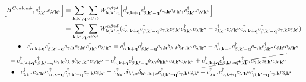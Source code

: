 \documentclass[12pt,english,a4paper]{article}
\newcommand{\dg}{\dagger}
\begin{document}
\begin{appendices}
\begin{align}
	\comm{H^{Coulomb}}{c^\dg_{\lambda \textbf{k}''} c_{\lambda' \textbf{k}''}} &= \sum_{\textbf{k}, \textbf{k}', \textbf{q}} \sum_{\alpha \beta \gamma \delta} W^{\alpha \beta \gamma \delta}_{\textbf{k},\textbf{k'},\textbf{q}}\comm{ c_{\alpha, \textbf{k}+\textbf{q}}^\dg c_{\beta, \textbf{k}' - \textbf{q}}^\dg c_{\gamma, \textbf{k}}c_{\delta, \textbf{k'}}}{c^\dg_{\lambda \textbf{k}''} c_{\lambda' \textbf{k}''}} \nonumber\\
	&= \sum_{\textbf{k}, \textbf{k}', \textbf{q}} \sum_{\alpha \beta \gamma \delta} W^{\alpha \beta \gamma \delta}_{\textbf{k},\textbf{k'},\textbf{q}}( c_{\alpha, \textbf{k}+\textbf{q}}^\dg c_{\beta, \textbf{k}' - \textbf{q}}^\dg c_{\gamma, \textbf{k}}c_{\delta, \textbf{k'}}c^\dg_{\lambda \textbf{k}''} c_{\lambda' \textbf{k}''} 
	-  c^\dg_{\lambda \textbf{k}''} c_{\lambda' \textbf{k}''}c_{\alpha, \textbf{k}+\textbf{q}}^\dg c_{\beta, \textbf{k}' - \textbf{q}}^\dg c_{\gamma, \textbf{k}}c_{\delta, \textbf{k'}}) \nonumber \\
\bullet	 \quad c_{\alpha, \textbf{k}+\textbf{q}}^\dg c_{\beta, \textbf{k}' - \textbf{q}}^\dg &c_{\gamma, \textbf{k}}c_{\delta, \textbf{k'}}c^\dg_{\lambda \textbf{k}''} c_{\lambda' \textbf{k}''} = c_{\alpha, \textbf{k}+\textbf{q}}^\dg c_{\beta, \textbf{k}' - \textbf{q}}^\dg c_{\gamma, \textbf{k}}\delta_{\lambda,\delta} \delta_{\textbf{k}',\textbf{k}''} c_{\lambda' \textbf{k}''} - c_{\alpha, \textbf{k}+\textbf{q}}^\dg c_{\beta, \textbf{k}' - \textbf{q}}^\dg c_{\gamma, \textbf{k}} c^\dg_{\lambda \textbf{k}''}c_{\delta, \textbf{k'}} c_{\lambda' \textbf{k}''} \nonumber\\
%
%
= c_{\alpha, \textbf{k}+\textbf{q}}^\dg c_{\beta, \textbf{k}' - \textbf{q}}^\dg c_{\gamma, \textbf{k}}&\delta_{\lambda,\delta} \delta_{\textbf{k}',\textbf{k}''} c_{\lambda' \textbf{k}''} - c_{\alpha, \textbf{k}+\textbf{q}}^\dg c_{\beta, \textbf{k}' - \textbf{q}}^\dg \delta_{\lambda \gamma} \delta_{\textbf{k}\textbf{k}''}c_{\delta, \textbf{k'}} c_{\lambda' \textbf{k}''} 
+ \cancel{c_{\alpha, \textbf{k}+\textbf{q}}^\dg c_{\beta, \textbf{k}' - \textbf{q}}^\dg c^\dg_{\lambda \textbf{k}''}c_{\gamma, \textbf{k}} c_{\delta, \textbf{k'}} c_{\lambda' \textbf{k}''}}\nonumber \\
%
%
\bullet	 \quad c^\dg_{\lambda \textbf{k}''} c_{\lambda' \textbf{k}''} c_{\alpha, \textbf{k}+\textbf{q}}^\dg &c_{\beta, \textbf{k}' - \textbf{q}}^\dg c_{\gamma, \textbf{k}}c_{\delta, \textbf{k'}} = c^\dg_{\lambda \textbf{k}''} \delta_{\lambda',\alpha} \delta_{\textbf{k}'',\textbf{k}+q} c_{\beta, \textbf{k}' - \textbf{q}}^\dg c_{\gamma, \textbf{k}}c_{\delta, \textbf{k'}} - c^\dg_{\lambda \textbf{k}''}  c_{\alpha, \textbf{k}+\textbf{q}}^\dg c_{\lambda' \textbf{k}''} c_{\beta, \textbf{k}' - \textbf{q}}^\dg c_{\gamma, \textbf{k}}c_{\delta, \textbf{k'}} \nonumber\\

\end{align}
\end{appendices}
\end{document}
